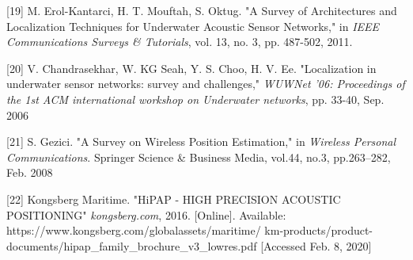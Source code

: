 [19] M. Erol-Kantarci, H. T. Mouftah, S. Oktug. "A Survey of Architectures and Localization Techniques for Underwater Acoustic Sensor Networks," in \textit{IEEE Communications Surveys \& Tutorials}, vol. 13, no. 3, pp. 487-502, 2011.
\label{r:r19}

[20] V. Chandrasekhar, W. KG Seah, Y. S. Choo, H. V. Ee. "Localization in underwater sensor networks: survey and challenges," \textit{WUWNet '06: Proceedings of the 1st ACM international workshop on Underwater networks}, pp. 33-40, Sep. 2006
\label{r:r20}

[21] S. Gezici. "A Survey on Wireless Position Estimation," in \textit{Wireless Personal Communications}. Springer Science \& Business Media, vol.44, no.3, pp.263–282, Feb. 2008
\label{r:r21}

[22] Kongsberg Maritime. "HiPAP - HIGH PRECISION ACOUSTIC POSITIONING"  \textit{kongsberg.com}, 2016. [Online]. Available: https://www.kongsberg.com/globalassets/maritime/
km-products/product-documents/hipap\_family\_brochure\_v3\_lowres.pdf [Accessed Feb. 8, 2020]

